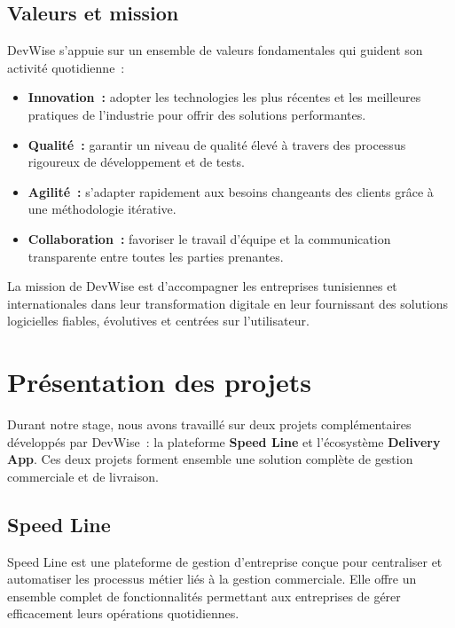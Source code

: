 \subsection{Valeurs et mission}
\label{subsec:valeurs-mission}

DevWise s'appuie sur un ensemble de valeurs fondamentales qui guident son activité quotidienne~:

\begin{itemize}
    \item \textbf{Innovation~:} adopter les technologies les plus récentes et les meilleures pratiques de l'industrie pour offrir des solutions performantes.
    \item \textbf{Qualité~:} garantir un niveau de qualité élevé à travers des processus rigoureux de développement et de tests.
    \item \textbf{Agilité~:} s'adapter rapidement aux besoins changeants des clients grâce à une méthodologie itérative.
    \item \textbf{Collaboration~:} favoriser le travail d'équipe et la communication transparente entre toutes les parties prenantes.
\end{itemize}

La mission de DevWise est d'accompagner les entreprises tunisiennes et internationales dans leur transformation digitale en leur fournissant des solutions logicielles fiables, évolutives et centrées sur l'utilisateur.

\section{Présentation des projets}
\label{sec:presentation-projets}

Durant notre stage, nous avons travaillé sur deux projets complémentaires développés par DevWise~: la plateforme \textbf{Speed Line} et l'écosystème \textbf{Delivery App}. Ces deux projets forment ensemble une solution complète de gestion commerciale et de livraison.

\subsection{Speed Line}
\label{subsec:speed-line}

Speed Line est une plateforme de gestion d'entreprise conçue pour centraliser et automatiser les processus métier liés à la gestion commerciale. Elle offre un ensemble complet de fonctionnalités permettant aux entreprises de gérer efficacement leurs opérations quotidiennes.

